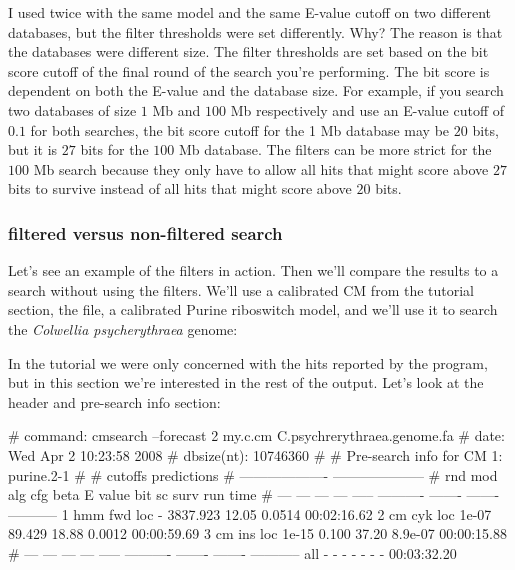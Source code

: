 \begin{srefaq}{I used  twice with the same model and
    the same E-value cutoff on two different databases, but the filter
    thresholds were set differently. Why?} The reason is that the
    databases were different size. The filter thresholds are set based
    on the bit score cutoff of the final round of the search you're
    performing. The bit score is dependent on both the E-value and the
    database size. For example, if you search two databases of size $1$
    Mb and $100$ Mb respectively and use an E-value cutoff of $0.1$ for both
    searches, the bit score cutoff for the 1 Mb database may be $20$
    bits, but it is $27$ bits for the $100$ Mb database. The filters
    can be more strict for the $100$ Mb search because they only have
    to allow all hits that might score above $27$ bits to
    survive instead of all hits that might score above $20$ bits. 
\end{srefaq}

\subsubsection{filtered versus non-filtered search}

Let's see an example of the filters in action. Then we'll compare the
results to a search without using the filters. We'll use a calibrated
CM from the tutorial section, the  file, a
calibrated Purine riboswitch model, and we'll use it to search the
\emph{Colwellia psycherythraea} genome:


In the tutorial we were only concerned with the hits reported by the
program, but in this section we're interested in the rest of the
output. Let's look at the header and pre-search info section:

\begin{sreoutput}
# command:    cmsearch --forecast 2 my.c.cm C.psychrerythraea.genome.fa
# date:       Wed Apr  2 10:23:58 2008
# dbsize(nt): 10746360
#
# Pre-search info for CM 1: purine.2-1
#
#                                  cutoffs            predictions     
#                            -------------------  --------------------
# rnd  mod  alg  cfg   beta     E value   bit sc     surv     run time
# ---  ---  ---  ---  -----  ----------  -------  -------  -----------
    1  hmm  fwd  loc      -    3837.923    12.05   0.0514  00:02:16.62
    2   cm  cyk  loc  1e-07      89.429    18.88   0.0012  00:00:59.69
    3   cm  ins  loc  1e-15       0.100    37.20  8.9e-07  00:00:15.88
# ---  ---  ---  ---  -----  ----------  -------  -------  -----------
  all    -    -    -      -           -        -        -  00:03:32.20
\end{sreoutput}

